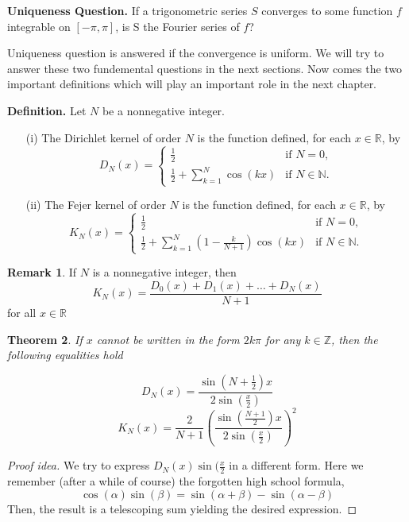 \documentclass[12pt]{amsart}
\newtheorem{theorem}{Theorem}[section]
\theoremstyle{definition}
\newtheorem{remark}[theorem]{Remark}
\begin{document}
\textbf{Uniqueness Question.} If a trigonometric series \( S \) converges to some function \( f \) integrable on \( [-\pi, \pi] \), is S the Fourier series of \(f\)?


Uniqueness question is answered if the convergence is uniform. We will try to answer these two fundemental questions in the next sections. Now comes the two important definitions which will play an important role in the next chapter.\footnotemark{}




\textbf{Definition.} Let $N$ be a nonnegative integer.
\begin{enumerate}
  \item[(i)] The Dirichlet kernel of order $N$ is the function defined, for each $x \in \mathbb{R}$, by
  \[
  D_N(x) = \begin{cases}
            \frac{1}{2} & \text{if } N = 0, \\
            \frac{1}{2}  + \sum_{k=1}^{N} \cos(kx) & \text{if } N \in \mathbb{N}.
           \end{cases}
  \]

  \item[(ii)] The Fejer kernel of order $N$ is the function defined, for each $x \in \mathbb{R}$, by
  \[
  K_N(x) = \begin{cases}
            \frac{1}{2} & \text{if } N = 0, \\
            \frac{1}{2} + \sum_{k=1}^{N}\left( 1 - \frac{k}{N + 1} \right)\cos(kx) & \text{if } N \in \mathbb{N}.
           \end{cases}
  \]
\end{enumerate}


\begin{remark}
    If $N$ is a nonnegative integer, then
\[
K_N(x) = \frac{D_0(x) + D_1(x) + \dots + D_N(x)}{N+1}
\]
for all $x \in \mathbb{R}$
\end{remark}


\begin{theorem}
    If $x$ cannot be written in the form $2k\pi$ for any $k \in \mathbb{Z}$, then the following equalities hold

    \[
    D_N(x) = \frac{\sin(N + \frac{1}{2})x}{2\sin(\frac{x}{2})}
    \]
    \[
    K_N(x) = \frac{2}{N+1}(\frac{\sin(\frac{N + 1}{2})x}{2\sin(\frac{x}{2})})^2
    \]
\end{theorem}


\begin{proof}[Proof idea] We try to express  $D_N(x)\sin(\frac{x}{2}$ in a different form. Here we remember (after a while of course) the forgotten high school formula,
\[
\cos(\alpha)\sin(\beta) = \sin(\alpha + \beta) - \sin(\alpha - \beta)
\]
    Then, the result is a telescoping sum yielding the desired expression.
\end{proof}
\end{document}
